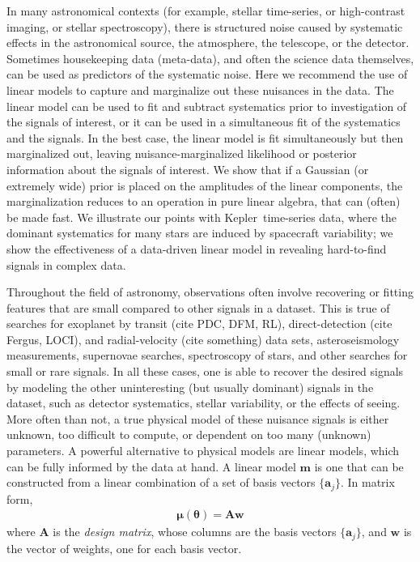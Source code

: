 \documentclass[modern]{rnaastex}
\newcommand{\project}[1]{\textsf{#1}}
\newcommand{\kepler}{\project{Kepler}}
\newcommand{\bvec}[1]{{\ensuremath{\boldsymbol{#1}}}}
\newcommand{\mA}{\ensuremath{\bvec{A}}}
\newcommand{\vw}{\ensuremath{\bvec{w}}}
\newcommand{\vm}{\ensuremath{\bvec{\mu}(\bvec{\theta})}}
\begin{document}
In many astronomical contexts (for example, stellar time-series, or
high-contrast imaging, or stellar spectroscopy), there is structured
noise caused by systematic
effects in the astronomical source, the atmosphere, the telescope, or
the detector.
Sometimes housekeeping data (meta-data), and often the science data themselves,
can be used as predictors of the systematic noise.
Here we recommend the use of linear models to capture and marginalize
out these nuisances in the data.
The linear model can be used to fit and subtract systematics prior to
investigation of the signals of interest, or it
can be used in a simultaneous fit of the systematics and the signals.
In the best case, the linear model is fit simultaneously but then marginalized
out, leaving nuisance-marginalized likelihood or posterior information
about the signals of interest.
We show that if a Gaussian (or extremely wide) prior is placed on the
amplitudes of the linear components, the marginalization reduces to an
operation in pure linear algebra, that can (often) be made fast.
We illustrate our points with \kepler\ time-series data, where the dominant
systematics for many stars are induced by spacecraft variability;
we show the effectiveness of a data-driven linear model in revealing
hard-to-find signals in complex data.

Throughout the field of astronomy, observations often involve recovering or
fitting features that are small compared to other signals in a dataset.
This is true of searches for exoplanet by transit (cite PDC, DFM, RL),
direct-detection (cite Fergus, LOCI), and radial-velocity  (cite something)
data sets, asteroseismology measurements, supernovae searches, spectroscopy
of stars, and other searches for small or rare signals. In all these cases,
one is able to recover the desired signals by modeling the other uninteresting
(but usually dominant) signals in the dataset, such as detector systematics,
stellar variability, or the effects of seeing.
More often than not, a true physical model of these nuisance signals is either
unknown, too difficult to compute, or dependent on too many (unknown)
parameters. A powerful alternative to physical models are linear models, which
can be fully informed by the data at hand. A linear model $\bvec{m}$ is one
that can be constructed from a linear combination of a set of basis vectors
$\{\bvec{a}_j\}$. In matrix form,
%
\begin{align}
\vm = \mA \vw
\end{align}
%
where $\mA$ is the \emph{design matrix}, whose columns are the basis
vectors $\{\bvec{a}_j\}$, and $\vw$ is the vector of weights, one
for each basis vector.
\end{document}
